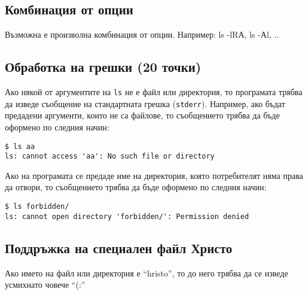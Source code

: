 \documentclass[a4paper,10pt]{article}
\begin{document}
\subsection{Комбинация от опции}
Възможна е произволна комбинация от опции. Например: ls -lRА, ls -Аl, ..

\subsection{Обработка на грешки (20 точки)}

Ако някой от аргументите на \lstinline{ls} не е файл или директория, то програмата трябва да изведе съобщение на стандартната грешка (\lstinline{stderr}). Например, ако бъдат предадени аргументи, които не са файлове, то
съобщението трябва да бъде оформено по следния начин:
\begin{verbatim}
$ ls aa
ls: cannot access 'aa': No such file or directory
\end{verbatim}

Ако на програмата се предаде име на директория, която потребителят няма права да отвори, то
съобщението трябва да бъде оформено по следния начин:
\begin{verbatim}
$ ls forbidden/
ls: cannot open directory 'forbidden/': Permission denied
\end{verbatim}

\color{white}


\subsection{Поддръжка на специален файл Христо}
Ако името на файл или директория е ``hristo'', то до него трябва да се изведе усмихнато човече ``(:''


\color{black}
\end{document}
